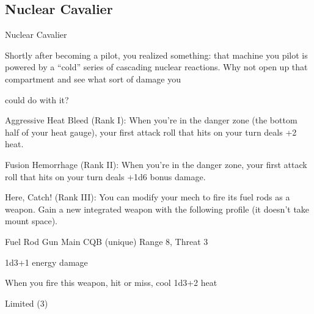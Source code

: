 \subsection{Nuclear Cavalier}

                                             Nuclear Cavalier   

Shortly after becoming a pilot, you realized something: that machine you pilot is powered by a “cold” series  
of cascading nuclear reactions. Why not open up that compartment and see what sort of damage you  

could do with it?   

Aggressive Heat Bleed  (Rank I): When you’re in the danger zone (the bottom half of your heat  
gauge), your first attack roll that hits on your turn deals +2 heat.
 
Fusion Hemorrhage (Rank II): When you’re in the danger zone, your first attack roll that hits on  
your turn deals +1d6 bonus damage.
 
Here, Catch! (Rank III): You can modify your mech to fire its fuel rods as a weapon. Gain a new  
integrated weapon with the following profile (it doesn’t take mount space).
 
         Fuel Rod Gun	   
         Main CQB (unique)  
         Range 8, Threat 3
 
         1d3+1 energy damage
 
         When you fire this weapon, hit or miss, cool 1d3+2 heat
 
         Limited (3)  